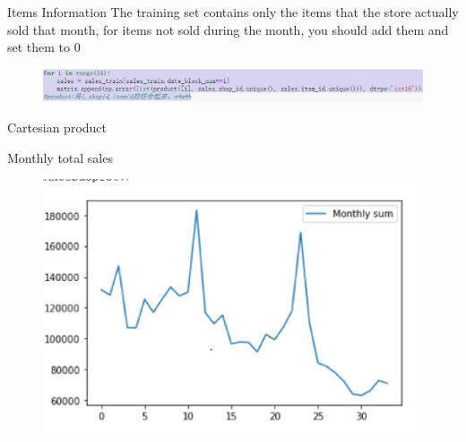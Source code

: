 \documentclass[
 size=14pt,
 paper=smartboard,  %
 mode=present, 		%
 display=slides, 	%
 style=tuliplab,  	%
 pauseslide,
 fleqn,leqno]{powerdot}
\begin{document}
\begin{slide}[toc=,bm=]{Items Information}
  The training set contains only the items that the store actually sold that month,
  for items not sold during the month, you should add them and set them to 0
  \begin{figure}
    \includegraphics[scale=0.5]{picture/data_15.eps}
  \end{figure}
   Cartesian product
\end{slide}

\begin{slide}[toc=,bm=]{Monthly total sales}
 
  \begin{figure}
    \includegraphics[scale=0.5]{picture/data_18.eps}
  \end{figure}
\end{slide}
\end{document}
